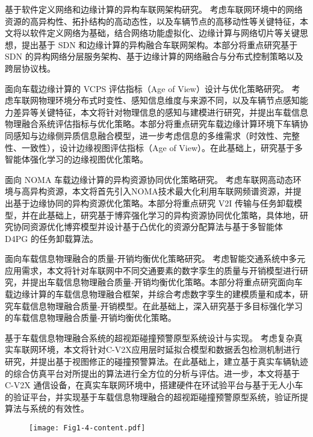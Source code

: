  基于软件定义网络和边缘计算的异构车联网架构研究。
考虑车联网环境中的网络资源的高异构性、拓扑结构的高动态性，以及车辆节点的高移动性等关键特征，本文将以软件定义网络为基础，结合网络功能虚拟化、边缘计算与网络切片等关键思想，提出基于 SDN 和边缘计算的异构融合车联网架构。本部分将重点研究基于 SDN 的异构网络分层服务架构、基于边缘计算的网络融合与分布式控制策略以及跨层协议栈。

 面向车载边缘计算的 VCPS 评估指标（Age of View）设计与优化策略研究。
考虑车联网物理环境分布式时变性、感知信息维度与来源不同，以及车辆节点感知能力差异等关键特征，本文将针对物理信息的感知与建模进行研究，并提出车载信息物理融合系统评估指标与优化策略。本部分将重点研究车载边缘计算环境下车辆协同感知与边缘侧异质信息融合模型，进一步考虑信息的多维需求（时效性、完整性、一致性），设计边缘视图评估指标（Age of View）。在此基础上，研究基于多智能体强化学习的边缘视图优化策略。

 面向 NOMA 车载边缘计算的异构资源协同优化策略研究。
考虑车联网高动态环境与高异构资源，本文将首先引入NOMA技术最大化利用车联网频谱资源，并提出基于边缘协同的异构资源优化策略。本部分将重点研究 V2I 传输与任务卸载模型，并在此基础上，研究基于博弈强化学习的异构资源协同优化策略，具体地，研究协同资源优化博弈模型并设计基于凸优化的资源分配算法与基于多智能体 D4PG 的任务卸载算法。

 面向车载信息物理融合的质量-开销均衡优化策略研究。
考虑智能交通系统中多元应用需求，本文将针对车联网中不同交通要素的数字孪生的质量与开销模型进行研究，并提出车载信息物理融合质量-开销均衡优化策略。本部分将重点研究面向车载边缘计算的车载信息物理融合框架，并综合考虑数字孪生的建模质量和成本，研究车载信息物理融合质量-开销模型。在此基础上，深入研究基于多目标强化学习的车载信息物理融合质量-开销均衡优化策略。

 基于车载信息物理融合系统的超视距碰撞预警原型系统设计与实现。
考虑复杂真实车联网环境，本文将针对C-V2X应用层时延拟合模型和数据丢包检测机制进行研究，并提出基于视图修正的碰撞预警算法。在此基础上，建立基于真实车辆轨迹的综合仿真平台对所提出的算法进行全方位的分析与评估。进一步，本文将基于 C-V2X 通信设备，在真实车联网环境中，搭建硬件在环试验平台与基于无人小车的验证平台，并实现基于车载信息物理融合的超视距碰撞预警原型系统，验证所提算法与系统的有效性。

\begin{figure}[h] 
	\centering
	\texttt{[image: Fig1-4-content.pdf]}
	\label{fig 1-4}
\end{figure}

